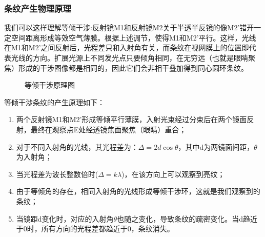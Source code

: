 \documentclass[12pt]{article}
\begin{document}
\subsubsection{条纹产生物理原理}
\quad 我们可以这样理解等倾干涉:反射镜M1和反射镜M2关于半透半反镜的像M2'错开一定空间距离形成等效空气薄膜。根据上述调节，使得M1和M2'平行。这样，光线在M1和M2'之间反射后，光程差只和入射角有关，而条纹在视网膜上的位置即代表光线的方向。扩展光源上不同发光点只要倾角相同，在无穷远（也就是眼睛聚焦）形成的干涉图像都是相同的，因此它们会非相干叠加得到同心圆环条纹。
\begin{figure}[H]
    \centering
    \caption{等倾干涉原理图}
    \label{fig:eq_incline_principle}
\end{figure}

等倾干涉条纹的产生原理如下：
\begin{enumerate}
    \item 两个反射镜M1和M2'形成等倾平行薄膜，入射光束经过分束后在两个镜面反射，最终在观察点E处经透镜焦面聚焦（眼睛）重合；
    \item 对于不同入射角的光线，其光程差为：$\Delta = 2d\cos\theta$，其中d为两镜面间距，$\theta$为入射角；
    \item 当光程差为波长整数倍时($\Delta = k\lambda$)，在该方向上可以观察到亮纹；
    \item 由于等倾角的存在，相同入射角的光线形成等倾干涉环，这就是我们观察到的条纹；
    \item 当镜距d变化时，对应的入射角$\theta$也随之变化，导致条纹的疏密变化。当d趋近于0时，所有方向的光程差都趋近于0，条纹消失。
\end{enumerate}
\end{document}
